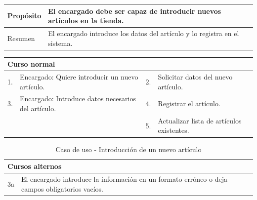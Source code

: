 \begin{table}[H]
	\centering
	\begin{tabular}{| m{} | m{} | m{} | m{} |}
		\hline
		Propósito & \multicolumn{3}{m{0.67\textwidth}|}{El encargado debe ser capaz de introducir nuevos artículos en la tienda.}   \\ 
		\hline
		Resumen & \multicolumn{3}{m{0.67\textwidth}|}{El encargado introduce los datos del artículo y lo registra en el sistema.} \\ 
		\hline
	\end{tabular}
\end{table}

\begin{table}[H]
	\centering
	\begin{tabular}{| m{} | m{} | m{} | m{} |}
		\hline
		\multicolumn{4}{|m{0.9\textwidth}|}{Curso normal}     \\ 
		\hline
		1. & Encargado: Quiere introducir un nuevo artículo. & 2. &  Solicitar datos del nuevo artículo.  \\ 
		\hline
		3. & Encargado: Introduce datos necesarios del artículo. & 4. & Registrar el artículo. \\ 
		\hline
		&  & 5. & Actualizar lista de artículos existentes. \\ 
		\hline
	\end{tabular}
\end{table}

\begin{table}[H]
	\centering
	\begin{tabular}{| m{} | m{} | m{} | m{} |}
		\hline
		\multicolumn{4}{|m{0.9\textwidth}|}{Cursos alternos}     \\ 
		\hline
		3a & \multicolumn{3}{m{0.67\textwidth}|}{El encargado introduce la información en un formato erróneo o deja campos obligatorios vacíos.} \\ 
		\hline
	\end{tabular}
	\caption{Caso de uso - Introducción de un nuevo artículo}
\end{table}

\newpage


